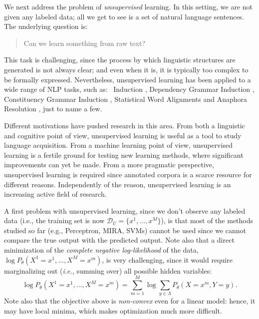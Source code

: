 We next address the problem of \emph{unsupervised} learning. 
In this setting, we are not given any labeled data; all we get to see is a set of natural language sentences.  
The underlying question is: 
\begin{quote}
Can we learn something from raw text?
\end{quote}
This task is challenging, since the process by which linguistic structures are generated is not always clear; 
and even when it is, it is typically too complex to be
formally expressed. Nevertheless, unsupervised learning has been applied to a
wide range of NLP tasks, such as: 
\pos\ Induction  \citep{schutze1995distributional,merialdo1994tet,clark03combining},
Dependency Grammar Induction \citep{klein2004acl,smith2006annealing}, Constituency Grammar Induction \citep{klein2004acl}, Statistical Word Alignments 
\citep{brown94mathematic} and Anaphora Resolution \citep{charniak2009works}, just to name a few. 

Different motivations have pushed research in this area. From both a linguistic and cognitive point of view, 
unsupervised learning is useful as a tool to study language acquisition. 
From a machine learning point of view, unsupervised learning is a fertile ground for testing new learning methods, 
where significant improvements can yet be made. 
From a more pragmatic perspective, unsupervised learning is required
since annotated corpora is a scarce resource for different reasons. Independently of the reason, unsupervised learning is an increasing active field of research.

A first problem with unsupervised learning, since we don't observe any labeled data (i.e., 
the training set is now $\mathcal{D}_{U} = \{x^1,\ldots, x^M\}$), 
is that most of the methods studied so far (e.g., Perceptron, MIRA, SVMs) cannot be used since we cannot compare 
the true output with the predicted output. 
Note also that a direct minimization of the \emph{complete negative log-likelihood} of the data, $\log P_{\theta}(X^1=x^1,\ldots,X^M=x^m)$, 
is very challenging, since it would require marginalizing out (\emph{i.e.}, summing over) all possible hidden variables:
\begin{equation}
 \log P_{\theta}(X^1=x^1,\ldots,X^M=x^m) =  \sum_{m=1}^M \log \sum_{y \in \Lambda} P_{\theta} (X=x^m,Y=y).
\end{equation}
Note also that the objective above is \emph{non-convex} even for a linear model: hence, it may have local minima, which makes optimization much 
more difficult.%

